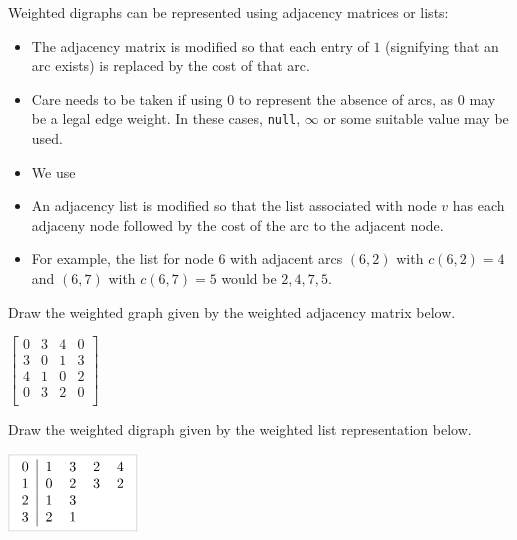 Weighted digraphs can be represented using adjacency matrices or lists:
\begin{itemize}
\item The adjacency matrix is modified so that
each entry of $1$ (signifying that an arc exists) is replaced by the
cost of that arc.
\item Care needs to be taken if using 0 to represent the absence of arcs, as 0 may be a legal edge weight. 
In these cases, \texttt{null}, $\infty$ or some suitable value may be used.
\item We use 
\item An adjacency list is modified so that the list associated  with node $v$ has each adjaceny node followed by the cost of the arc to the adjacent node. 
\item For example, the list for node 6 with adjacent arcs $(6,2)$ with $c(6,2) = 4$ and $(6,7)$ with $c(6,7) = 5$ would be $2,4,7,5$.
\end{itemize}



\begin{Boxample}[1]
Draw the weighted graph given by the weighted adjacency matrix below. 
\newline

$
\left[
\begin{array}{cccc}
0 & 3 & 4 & 0  \\
3 & 0 & 1 & 3  \\
4 & 1 & 0 & 2  \\
0 & 3 & 2 & 0  \\
\end{array}
\right]
$
\vspace{1cm}


Draw the weighted digraph given by the weighted list representation below.
\newline

$
\AdjLists{
\begin{tabular}{c|llll}
0 & 1 & 3 & 2 & 4 \\
1 & 0 & 2 & 3 & 2 \\
2 & 1 & 3 &   &   \\
3 & 2 & 1 &   &   \\
\end{tabular}
}
$
\end{Boxample}

